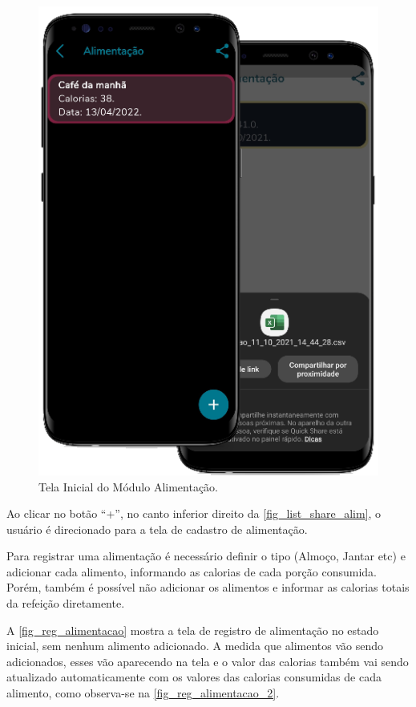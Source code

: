 \begin{figure}[htb]
    \caption{\label{fig_list_share_alim}Tela Inicial do Módulo Alimentação.}
    \begin{center}
        \includegraphics[scale=0.72]{Imagens/desenvolvimento/app/list_share_alim.png}
    \end{center}
\end{figure}

Ao clicar no botão “+”, no canto inferior direito da \autoref{fig_list_share_alim}, o usuário é direcionado
para a tela de cadastro de alimentação.

Para registrar uma alimentação é necessário definir o tipo (Almoço, Jantar etc) e adicionar cada alimento,
informando as calorias de cada porção consumida. Porém, também é possível não adicionar os alimentos
e informar as calorias totais da refeição diretamente.

A \autoref{fig_reg_alimentacao} mostra a tela de registro de alimentação no estado inicial, sem nenhum alimento
adicionado. A medida que alimentos vão sendo adicionados, esses vão aparecendo na tela e o valor das calorias
também vai sendo atualizado automaticamente com os valores das calorias consumidas de cada alimento, como
observa-se na \autoref{fig_reg_alimentacao_2}.

